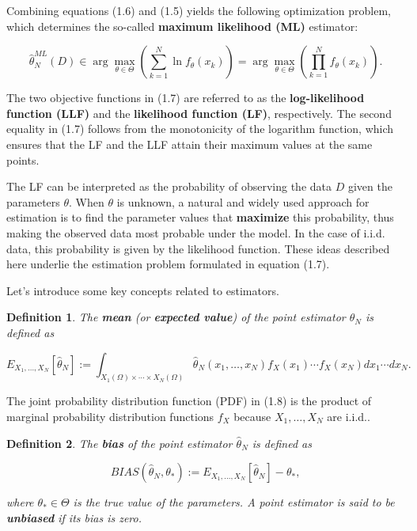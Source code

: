 \documentclass{report}
\newtheorem{definition}{Definition}[chapter]
\begin{document}
Combining equations (1.6) and (1.5) yields the following optimization problem, which determines the so-called \textbf{maximum likelihood (ML)} estimator:

\begin{equation}
\hat{\theta}^{ML}_N(D) \in \arg \max_{\theta \in \Theta} \left(\sum_{k=1}^N \ln f_\theta(x_k)\right) = \arg \max_{\theta \in \Theta} \left(\prod_{k=1}^N f_\theta(x_k) \right).
\end{equation}

The two objective functions in (1.7) are referred to as the \textbf{log-likelihood function (LLF)} and the \textbf{likelihood function (LF)}, respectively. The second equality in (1.7) follows from the monotonicity of the logarithm function, which ensures that the LF and the LLF attain their maximum values at the same points.

The LF can be interpreted as the probability of observing the data $D$ given the parameters $\theta$. When $\theta$ is unknown, a natural and widely used approach for estimation is to find the parameter values that \textbf{maximize} this probability, thus making the observed data most probable under the model. In the case of i.i.d. data, this probability is given by the likelihood function. These ideas described here underlie the estimation problem formulated in equation (1.7).

Let’s introduce some key concepts related to estimators.

\begin{definition}
The \textbf{mean} (or \textbf{expected value}) of the point estimator $\hat{\theta}_N$ is defined as

\begin{equation}
E_{X_1,\dots,X_N}[\hat{\theta}_N] := \int_{X_1(\Omega)\times \cdots \times X_N(\Omega)} \hat{\theta}_N(x_1,\dots,x_N)f_X(x_1)\cdots f_X(x_N) dx_1\cdots dx_N.
\end{equation}
\end{definition}

The joint probability distribution function (PDF) in (1.8) is the product of marginal probability distribution functions $f_X$ because $X_1,\dots,X_N$ are i.i.d..

\begin{definition}
The \textbf{bias} of the point estimator $\hat{\theta}_N$ is defined as

\begin{equation}
BIAS(\hat{\theta}_N,\theta_*) := E_{X_1,\dots,X_N}[\hat{\theta}_N] - \theta_*,
\end{equation}

where $\theta_* \in \Theta$ is the true value of the parameters. A point estimator is said to be \textbf{unbiased} if its bias is zero.
\end{definition}
\end{document}
